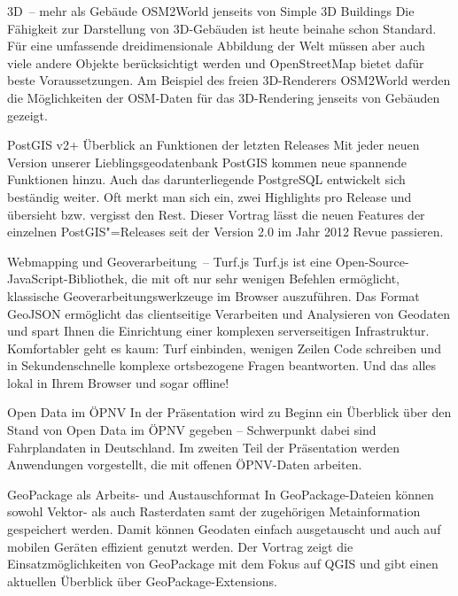 %
{3D~-- mehr als Gebäude}%
{OSM2World jenseits von Simple 3D Buildings}%
{%
Die Fähigkeit zur Darstellung von 3D-Gebäuden ist heute beinahe schon Standard. Für eine umfassende
dreidimensionale Abbildung der Welt müssen aber auch viele andere Objekte berücksichtigt werden und
OpenStreetMap bietet dafür beste Voraussetzungen. Am Beispiel des freien 3D-Renderers OSM2World
werden die Möglichkeiten der OSM-Daten für das 3D-Rendering jenseits von Gebäuden gezeigt.%
}




%
{PostGIS v2+}%
{Überblick an Funktionen der letzten Releases}%
{%
Mit jeder neuen Version unserer Lieblingsgeodatenbank PostGIS kommen neue spannende Funktionen
hinzu. Auch das darunterliegende PostgreSQL entwickelt sich beständig weiter. Oft merkt man sich
ein, zwei Highlights pro Release und übersieht bzw. vergisst den Rest. Dieser Vortrag lässt die
neuen Features der einzelnen PostGIS"=Releases seit der Version 2.0 im Jahr 2012 Revue passieren.%
}

%
{Webmapping und Geoverarbeitung~-- Turf.js}%
{}%
{%
Turf.js ist eine Open-Source-JavaScript-Bibliothek, die mit oft nur sehr wenigen Befehlen
ermöglicht, klassische Geoverarbeitungswerkzeuge im Browser auszuführen. Das Format GeoJSON
ermöglicht das clientseitige Verarbeiten und Analysieren von Geodaten und spart Ihnen die
Einrichtung einer komplexen serverseitigen Infrastruktur. Komfortabler geht es kaum: Turf einbinden,
wenigen Zeilen Code schreiben und in Sekundenschnelle komplexe ortsbezogene Fragen beantworten. Und
das alles lokal in Ihrem Browser und sogar offline!%
}

%
{Open Data im ÖPNV}%
{}%
{%
In der Präsentation wird zu Beginn ein Überblick über den Stand von Open Data im ÖPNV gegeben --
Schwerpunkt dabei sind Fahrplandaten in Deutschland. Im zweiten Teil der Präsentation werden
Anwendungen vorgestellt, die mit offenen ÖPNV-Daten arbeiten.%
}



%
{GeoPackage als Arbeits- und \mbox{Austauschformat}}%
{}%
{%
In GeoPackage-Dateien können sowohl Vektor- als auch Rasterdaten samt der zugehörigen Metainformation
gespeichert werden. Damit können Geodaten einfach ausgetauscht und auch auf mobilen Geräten
effizient genutzt werden.  Der Vortrag zeigt die Einsatzmöglichkeiten von GeoPackage mit dem Fokus
auf QGIS und gibt einen aktuellen Überblick über GeoPackage-Extensions.%
}

